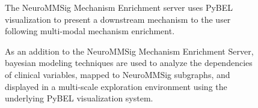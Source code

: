 \begin{figure}
\captionsetup{format=plain}
\caption[PyBEL Integration with the NeuroMMSig Mechanism Enrichment Server]{The NeuroMMSig Mechanism Enrichment server uses PyBEL visualization to present a downstream mechanism to the user following multi-modal mechanism enrichment.}
\label{Fig:wnt_neurommsig}
\end{figure}

\begin{figure}
\captionsetup{format=plain}
\caption[PyBEL Integration with the NeuroMMSig Bayesian Network Explorer]{As an addition to the \ac{NeuroMMSig} Mechanism Enrichment Server, bayesian modeling techniques are used to analyze the dependencies of clinical variables, mapped to \ac{NeuroMMSig} subgraphs, and displayed in a multi-scale exploration environment using the underlying PyBEL visualization system.}
\label{Fig:bayesian_viewer}
\end{figure}

